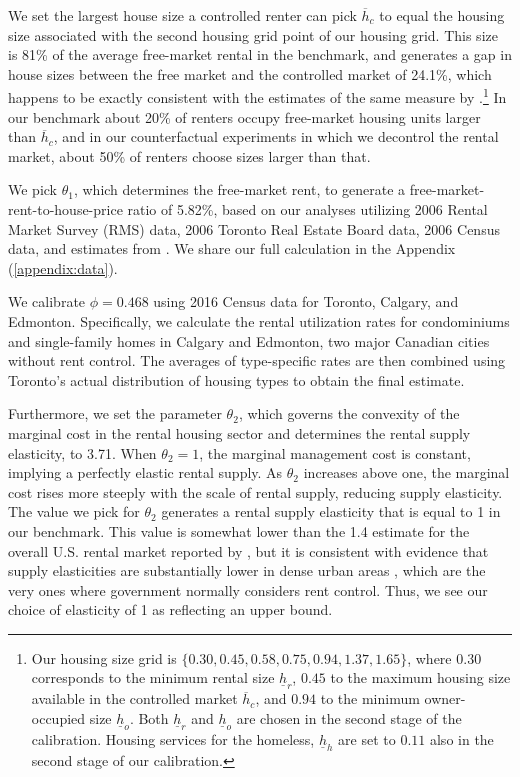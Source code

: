 \documentclass[parskip=full]{article}
\begin{document}
We set the largest house size a controlled renter can pick $\overline{h}_{c}$ to equal the housing size associated with the second housing grid point of our housing grid. This size is 81\% of the average free-market rental in the benchmark, and generates a gap in house sizes between the free market and the controlled market of 24.1\%, which happens to be exactly consistent with the estimates of the same measure by \citet{zhang-gou}.\footnote{Our housing size grid is $\{0.30, 0.45, 0.58, 0.75, 0.94, 1.37, 1.65\}$, where $0.30$ corresponds to the minimum rental size $\underline{h}_{r}$, $0.45$ to the maximum housing size available in the controlled market $\overline{h}_{c}$, and $0.94$ to the minimum owner-occupied size $\underline{h}_{o}$. Both $\underline{h}_{r}$ and $\underline{h}_{o}$ are chosen in the second stage of the calibration. Housing services for the homeless, $\underline{h}_{h}$ are set to $0.11$ also in the second stage of our calibration.} In our benchmark about 20\% of renters occupy free-market housing units larger than $\overline{h}_{c}$, and in our counterfactual experiments in which we decontrol the rental market, about 50\% of renters choose sizes larger than that.

We pick $\theta_1$, which determines the free-market rent, to generate a free-market-rent-to-house-price ratio of 5.82\%, based on our analyses utilizing 2006 Rental Market Survey (RMS) data, 2006 Toronto Real Estate Board data, 2006 Census data, and estimates from \citet{zhang-gou}. We share our full calculation in the Appendix (\ref{appendix:data}).

We calibrate $\phi=0.468$ using 2016 Census data for Toronto, Calgary, and Edmonton. Specifically, we calculate the rental utilization rates for condominiums and single-family homes in Calgary and Edmonton, two major Canadian cities without rent control. The averages of type-specific rates are then combined using Toronto’s actual distribution of housing types to obtain the final estimate. 

Furthermore, we set the parameter $\theta_2$, which governs the convexity of the marginal cost in the rental housing sector and determines the rental supply elasticity, to 3.71. When $\theta_2=1$, the marginal management cost is constant, implying a perfectly elastic rental supply. As $\theta_2$ increases above one, the marginal cost rises more steeply with the scale of rental supply, reducing supply elasticity. The value we pick for $\theta_2$ generates a rental supply elasticity that is equal to 1 in our benchmark. This value is somewhat lower than the 1.4 estimate for the overall U.S. rental market reported by \citet{rs-2023}, but it is consistent with evidence that supply elasticities are substantially lower in dense urban areas \citep{cy-1994,susin-2002,fack-2006,sy-2020}, which are the very ones where government normally considers rent control. Thus, we see our choice of elasticity of 1 as reflecting an upper bound.
\end{document}

